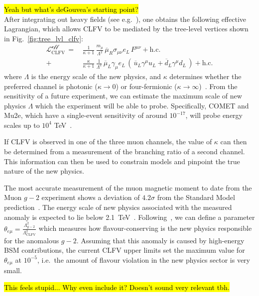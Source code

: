 \hl{Yeah but what's deGouvea's starting point?}\\
After integrating out heavy fields (see
e.g.~\cite[Chapter~IV]{donoghue_golowich_holstein_2014}), one obtains the
following effective Lagrangian, which allows CLFV to be mediated by the
tree-level vertices shown in Fig.~\ref{fig:tree_lvl_clfv}:
\begin{align}\label{eq:Leff}
    \mathcal{L^\text{eff}_\mathrm{CLFV}}\,
    =\,
    &\frac{1}{\kappa+1}\, \frac{m_\mu}{\Lambda^2}\,
    \overline{\mu}_R \sigma_{\mu\nu} e_L \, F^{\mu\nu} + \text{h.c.}
    \nonumber\\[1em]
    +\,
    &\frac{\kappa}{\kappa+1}\, \frac{1}{\Lambda^2}\,
    \overline{\mu}_L \gamma_\mu e_L \,
    (\,
        \overline{u}_L \gamma^\mu u_L + \overline{d}_L \gamma^\mu d_L
    \,) + \text{h.c.}
\end{align}
where $\Lambda$ is the energy scale of the new physics, and $\kappa$ determines
whether the preferred channel is photonic ($\kappa \rightarrow 0$) or
four-fermionic ($\kappa \rightarrow \infty$)~\cite{DEGOUVEA201375}. 
From the sensitivity of a future experiment, we can estimate the maximum scale
of new physics $\Lambda$ which the experiment will be able to probe. 
Specifically, COMET and Mu2e, which have a single-event sensitivity of around
$10^{-17}$, will probe energy scales up to $10^4$
\si{\tera\eV}~\cite{DEGOUVEA201375}.

If CLFV is observed in one of the three muon channels, the value of $\kappa$ can
then be determined from a measurement of the branching ratio of a second
channel. This information can then be used to constrain models and pinpoint the
true nature of the new physics.

The most accurate measurement of the muon magnetic moment to date from the Muon
$g-2$ experiment shows a deviation of $4.2\sigma$ from the Standard Model
prediction~\cite{PhysRevLett.126.141801}. The energy scale of new physics
associated with the measured anomaly is expected to lie below
\SI{2.1}{\tera\eV}~\cite{KESHAVARZI2022115675}. Following~\cite{DEGOUVEA201375},
we can define a parameter $\theta_{e\mu} =
\frac{\Lambda^2_{g-2}}{\Lambda^2_\text{CLFV}}$ which measures how flavour-conserving
is the new physics responsible for the anomalous $g-2$. Assuming that this
anomaly is caused by high-energy BSM contributions, the current CLFV upper
limits set the maximum value for $\theta_{e\mu}$ at $10^{-5}$, i.e.\ the
amount of flavour violation in the new physics sector is very small.


\hl{This feels stupid... Why even include it? Doesn't sound very relevant tbh.}